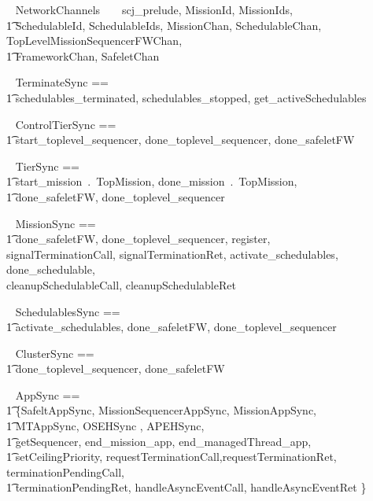 

\begin{zsection}
	\SECTION ~ NetworkChannels ~ \parents ~ scj\_prelude, MissionId, MissionIds, \\
		\t1 SchedulableId, SchedulableIds, MissionChan, SchedulableChan, TopLevelMissionSequencerFWChan,\\
		\t1 FrameworkChan, SafeletChan
\end{zsection}
%
\begin{circus}
\circchannelset ~ TerminateSync == \\ \t1 \lchanset schedulables\_terminated, schedulables\_stopped, get\_activeSchedulables \rchanset
\end{circus}
%
\begin{circus}
\circchannelset ~ ControlTierSync ==\\ \t1 \lchanset start\_toplevel\_sequencer, done\_toplevel\_sequencer, done\_safeletFW \rchanset
\end{circus}
\begin{circus}
\circchannelset ~ TierSync == \\ \t1 \lchanset start\_mission~.~TopMission, done\_mission~.~TopMission,\\
	\t1 done\_safeletFW, done\_toplevel\_sequencer \rchanset
\end{circus}
%
\begin{circus}
\circchannelset ~ MissionSync == \\ \t1 \lchanset done\_safeletFW, done\_toplevel\_sequencer, register, \\
                 signalTerminationCall, signalTerminationRet, activate\_schedulables, done\_schedulable, \\
                 cleanupSchedulableCall, cleanupSchedulableRet  \rchanset
\end{circus}
%
\begin{circus}
\circchannelset ~ SchedulablesSync == \\ \t1 \lchanset activate\_schedulables, done\_safeletFW, done\_toplevel\_sequencer \rchanset
\end{circus}
%
\begin{circus}
\circchannelset ~ ClusterSync == \\ \t1 \lchanset done\_toplevel\_sequencer, done\_safeletFW \rchanset
\end{circus}
%
\begin{circus}
\circchannelset ~ AppSync == \\ \t1  \bigcup \{SafeltAppSync, MissionSequencerAppSync, MissionAppSync, \\ \t1 MTAppSync, OSEHSync , APEHSync,  \\ \t1
	\lchanset getSequencer, end\_mission\_app, end\_managedThread\_app, \\ \t1 setCeilingPriority, requestTerminationCall,requestTerminationRet, terminationPendingCall, \\ \t1 terminationPendingRet, handleAsyncEventCall, handleAsyncEventRet \rchanset  \}
\end{circus}
